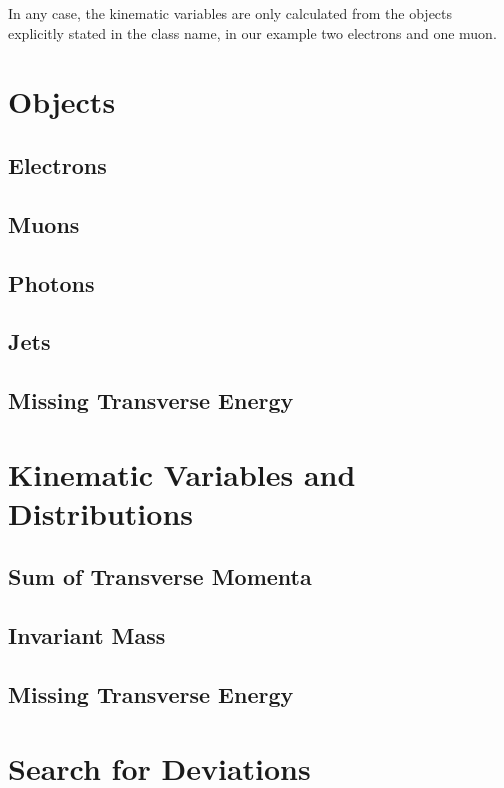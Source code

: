 In any case, the kinematic variables are only calculated from the objects explicitly stated in the class name, in our example two electrons and one muon.


\section{Objects}

\subsection{Electrons}

\subsection{Muons}

\subsection{Photons}

\subsection{Jets}

\subsection{Missing Transverse Energy}



\section{Kinematic Variables and Distributions}

\subsection{Sum of Transverse Momenta}

\subsection{Invariant Mass}

\subsection{Missing Transverse Energy}


\section{Search for Deviations}
\label{sec:deviations_search}


